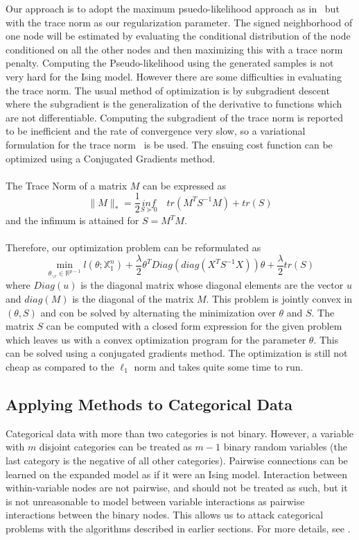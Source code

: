 \documentclass[11pt]{article}
\begin{document}
Our approach is to adopt the maximum psuedo-likelihood approach as in~\cite{ravikumar2010high} but with the trace norm as our regularization parameter. 
The signed neighborhood of one node will be estimated by evaluating the conditional distribution of the node conditioned on all the other nodes and then maximizing this with a trace norm penalty.
Computing the Pseudo-likelihood using the generated samples is not very hard for the Ising model. 
However there are some difficulties in evaluating the trace norm. 
The usual method of optimization is by subgradient descent where the subgradient is the generalization of the derivative to functions which are not differentiable. 
Computing the subgradient of the trace norm is reported to be inefficient and the rate of convergence very slow, so a variational formulation for the trace norm~\cite{grave2011trace} is be used. 
The ensuing cost function can be optimized using a Conjugated Gradients method.\\ \\
The Trace Norm of a matrix $M$ can be expressed as 
$$ \|M\|_* = \frac{1}{2} \underset{S \succeq 0}{inf} \quad  tr(M^T S^{-1} M) + tr(S)	 $$
and the infimum is attained for $S = M^T M$.\\ \\
Therefore, our optimization problem can be reformulated as
$$ \min_{\theta_{\backslash r} \in \mathbb{R}^{p-1}}  l(\theta; \mathbb{X}^n_1) + \frac{\lambda}{2} \theta^T Diag(diag(X^T S^{-1} X ))\theta + \frac{\lambda}{2} tr(S) $$ 
where $Diag(u)$ is the diagonal matrix whose diagonal elements are the vector $u$ and $diag(M)$ is the diagonal of the matrix $M$.
This problem is jointly convex in $(\theta, S)$ and con be solved by alternating the minimization over $\theta$ and $S$.
The matrix $S$ can be computed with a closed form expression for the given problem which leaves us with a convex optimization program for the parameter $\theta$.
This can be solved using a conjugated gradients method. The optimization is still not cheap as compared to the $\ell_1$ norm and takes quite some time to run. 

\subsection{Applying Methods to Categorical Data}
Categorical data with more than two categories is not binary.
However, a variable with $m$ disjoint categories can be treated as $m - 1$ binary random variables (the last category is the negative of all other categories).
Pairwise connections can be learned on the expanded model as if it were an Ising model.
Interaction between within-variable nodes are not pairwise, and should not be treated as such, but it is not unreasonable to model between variable interactions as pairwise interactions between the binary nodes.
This allows us to attack categorical problems with the algorithms described in earlier sections.
For more details, see \cite{ravikumar2010high}.  
\end{document}
